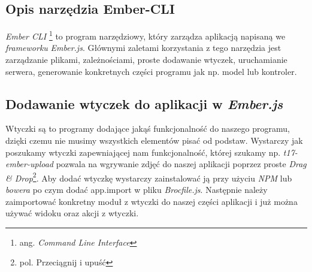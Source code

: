 \documentclass[openright]{xmgr}
\begin{document}
\subsection{Opis narzędzia Ember-CLI}
\textit{Ember CLI} \footnote{ang. \textit{Command Line Interface}} to program narzędziowy, który zarządza aplikacją napisaną we \textit{frameworku} \textit{Ember.js}. Głównymi zaletami korzystania z tego narzędzia jest zarządzanie plikami, zależnościami, proste dodawanie wtyczek, uruchamianie serwera, generowanie konkretnych części programu jak np. model lub kontroler.

\subsection{Dodawanie wtyczek do aplikacji w \textit{Ember.js}}
Wtyczki są to programy dodające jakąś funkcjonalność do naszego programu, dzięki czemu nie musimy wszystkich elementów pisać od podstaw. Wystarczy jak poszukamy wtyczki zapewniającej nam funkcjonalność, której szukamy np. \textit{t17-ember-upload} pozwala na wgrywanie zdjęć do naszej aplikacji poprzez proste \textit{Drag \& Drop}\footnote{pol. Przeciągnij i upuść}.  Aby dodać wtyczkę wystarczy zainstalować ją przy użyciu \textit{NPM} lub \textit{bowera}  po czym dodać app.import w pliku \textit{Brocfile.js}. Następnie należy zaimportować konkretny moduł z wtyczki do naszej części aplikacji i już można używać widoku oraz akcji z wtyczki.
\end{document}
